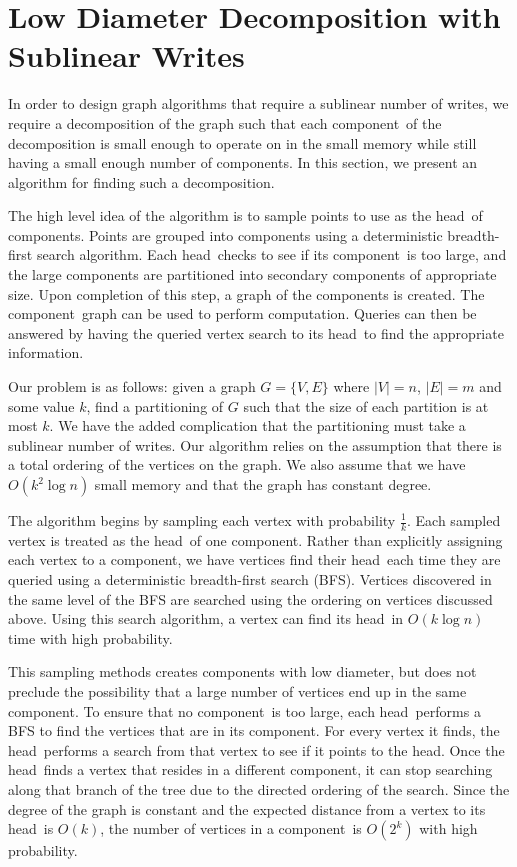 
\section{Low Diameter Decomposition with Sublinear Writes}

\newcommand{\clustcenter}{head}
\newcommand{\cluster}{component}
\newcommand{\tentative}[1]{{\color{red} #1}}

In order to design graph algorithms that require a sublinear number of writes, we require a decomposition of the graph such that each \cluster\ of the decomposition is small enough to operate on in the small memory while still having a small enough number of \cluster s. In this section, we present an algorithm for finding such a decomposition. 

The high level idea of the algorithm is to sample points to use as the \clustcenter\ of \cluster s. Points are grouped into \cluster s using a deterministic breadth-first search algorithm. Each \clustcenter\ checks to see if its \cluster\ is too large, and the large \cluster s are partitioned into secondary \cluster s of appropriate size. Upon completion of this step, a graph of the \cluster s is created. The \cluster\ graph can be used to perform computation. Queries can then be answered by having the queried vertex search to its \clustcenter\ to find the appropriate information. 

Our problem is as follows: given a graph $G = \{V, E\}$ where $|V| = n$, $|E| = m$ and some value $k$, find a partitioning of $G$ such that the size of each partition is at most $k$. We have the added complication that the partitioning must take a sublinear number of writes. Our algorithm relies on the assumption that there is a total ordering of the vertices on the graph. We also assume that we have $O(k^2\log{n})$ small memory and that the graph has constant degree. 

The algorithm begins by sampling each vertex with probability $\frac{1}{k}$. Each sampled vertex is treated as the \clustcenter\ of one \cluster. Rather than explicitly assigning each vertex to a \cluster, we have vertices find their \clustcenter\ each time they are queried using a deterministic breadth-first search (BFS). Vertices discovered in the same level of the BFS are searched using the ordering on vertices discussed above. \tentative{Using this search algorithm, a vertex can find its \clustcenter\ in $O(k\log{n})$ time with high probability. }

This sampling methods creates \cluster s with low diameter, but does not preclude the possibility that a large number of vertices end up in the same \cluster. To ensure that no \cluster\ is too large, each \clustcenter\ performs a BFS to find the vertices that are in its \cluster. For every vertex it finds, the \clustcenter\ performs a search from that vertex to see if it points to the \clustcenter. Once the \clustcenter\ finds a vertex that resides in a different \cluster, it can stop searching along that branch of the tree due to the directed ordering of the search. \tentative{Since the degree of the graph is constant and the expected distance from a vertex to its \clustcenter\ is $O(k)$, the number of vertices in a \cluster\ is $O(2^k)$ with high probability. }

